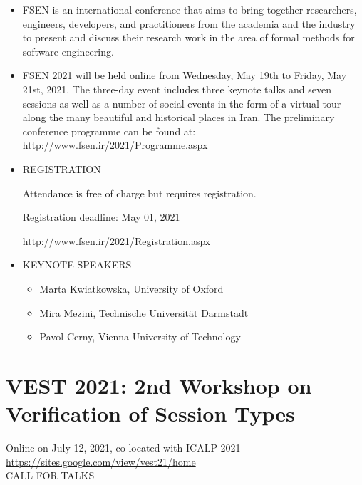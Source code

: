 \documentclass[prodmode,acmtecs]{acmsmall} %
\begin{document}
\begin{itemize}\item  FSEN is an international conference that aims to bring together researchers, engineers, developers, and practitioners from the academia and the industry to present and discuss their research work in the area of formal methods for software engineering. 
 
\item  FSEN 2021 will be held online from Wednesday, May 19th to Friday, May 21st, 2021. The three-day event includes three keynote talks and seven sessions as well as a number of social events in the form of a virtual tour along the many beautiful and historical places in Iran. The preliminary conference programme can be found at: \href{http://www.fsen.ir/2021/Programme.aspx}{http://www.fsen.ir/2021/Programme.aspx} 
 
\item  REGISTRATION  
 
  Attendance is free of charge but requires registration.  
 
Registration deadline: May 01, 2021 
 
  \href{http://www.fsen.ir/2021/Registration.aspx}{http://www.fsen.ir/2021/Registration.aspx} 
 
\item  KEYNOTE SPEAKERS 
 
\begin{itemize}\item  Marta Kwiatkowska, University of Oxford
\item  Mira Mezini, Technische Universität Darmstadt
\item  Pavol Cerny, Vienna University of Technology 
\end{itemize} 
\end{itemize}\section{VEST 2021: 2nd Workshop on Verification of Session Types}\label{VEST2021}  Online on July 12, 2021, co-located with ICALP 2021\\ 
  \href{https://sites.google.com/view/vest21/home}{https://sites.google.com/view/vest21/home}\\ 
CALL FOR TALKS 
\end{document}
